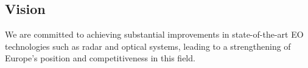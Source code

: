 \subsection{Vision}
We are committed to achieving substantial improvements in state-of-the-art EO technologies such as radar and optical systems, leading to a strengthening of Europe's position and competitiveness in this field. 


